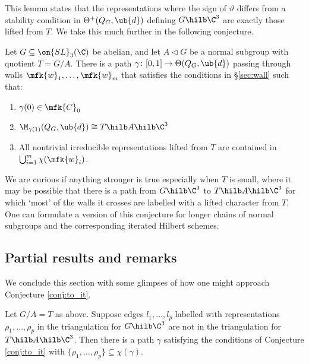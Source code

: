 \documentclass[leqno,11pt,a4paper]{amsart}
\begin{document}
This lemma states that the representations where the sign of $\vartheta$ differs from a stability condition in $\Theta^+(Q_G,\ub{d})$ defining $G\hilb\C^3$ are exactly those lifted from $T$. We take this much further in the following conjecture.

\begin{conjecture} \label{conj:to_it} Let $G\subseteq\on{SL}_3(\C)$ be abelian, and let $A\lhd G$ be a normal subgroup with quotient $T=G/A$. There is a path $\gamma\colon[0,1]\to\Theta(Q_G,\ub{d})$ passing through walls $\mfk{w}_1,\dots,\mfk{w}_m$ that satisfies the conditions in \S\ref{sec:wall} such that:
\begin{enumerate}
\item $\gamma(0)\in\mfk{C}_0$
\item $\M_{\gamma(1)}(Q_G,\ub{d})\cong T\hilb A\hilb\C^3$
\item All nontrivial irreducible representations lifted from $T$ are contained in $\bigcup_{i=1}^m\chi(\mfk{w}_i)$.
\end{enumerate}
\end{conjecture}

We are curious if anything stronger is true especially when $T$ is small, where it may be possible that there is a path from $G\hilb\C^3$ to $T\hilb A\hilb\C^3$ for which `most' of the walls it crosses are labelled with a lifted character from $T$. One can formulate a version of this conjecture for longer chains of normal subgroups and the corresponding iterated Hilbert schemes.

\subsection{Partial results and remarks} \label{sec:ex} We conclude this section with some glimpses of how one might approach Conjecture \ref{conj:to_it}.

\begin{prop} \label{prop:partial} Let $G/A=T$ as above. Suppose edges $l_1,\dots,l_p$ labelled with representations $\rho_1,\dots,\rho_p$ in the triangulation for $G\hilb\C^3$ are not in the triangulation for $T\hilb A\hilb\C^3$. Then there is a path $\gamma$ satisfying the conditions of Conjecture \ref{conj:to_it} with $\{\rho_1,\dots,\rho_p\}\subseteq\chi(\gamma)$.
\end{prop}
\end{document}
